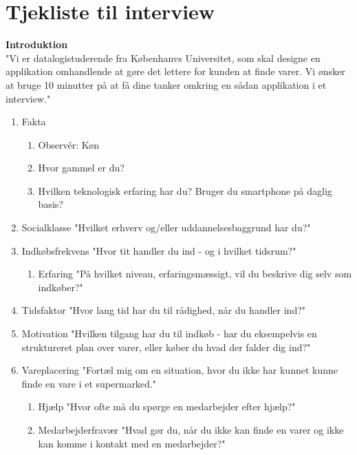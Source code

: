 \documentclass[12pt]{article}
\begin{document}
\newpage

\section{Tjekliste til interview}
\textbf{Introduktion}\\
"Vi er datalogistuderende fra Københanvs Universitet, som skal designe en applikation omhandlende at gøre det lettere for kunden at finde varer. Vi ønsker at bruge 10 minutter på at få dine tanker omkring en sådan applikation  i et interview."
 
\begin{enumerate}
\item Fakta
\begin{enumerate}
\item Observér: Køn
\item Hvor gammel er du?
\item Hvilken teknologisk erfaring har du? Bruger du smartphone på daglig basis?
\end{enumerate}

\item Socialklasse "Hvilket erhverv og/eller uddannelsesbaggrund har du?"

\item Indkøbsfrekvens "Hvor tit handler du ind - og i hvilket tidsrum?"

\begin{enumerate}
\item Erfaring	"På hvilket niveau, erfaringsmæssigt, vil du beskrive dig selv som indkøber?"
\end{enumerate}

\item Tidsfaktor "Hvor lang tid har du til rådighed, når du handler ind?"
\item Motivation "Hvilken tilgang har du til indkøb - har du eksempelvis en struktureret plan over varer, eller køber du hvad der falder dig ind?"
\item Vareplacering "Fortæl mig om en situation, hvor du ikke har kunnet kunne finde en vare i et supermarked."

\begin{enumerate}
\item Hjælp "Hvor ofte må du spørge en medarbejder efter hjælp?"
\item Medarbejderfravær "Hvad gør du, når du ikke kan finde en varer og ikke kan komme i kontakt med en medarbejder?"
\end{enumerate}


\end{enumerate}
\end{document}
